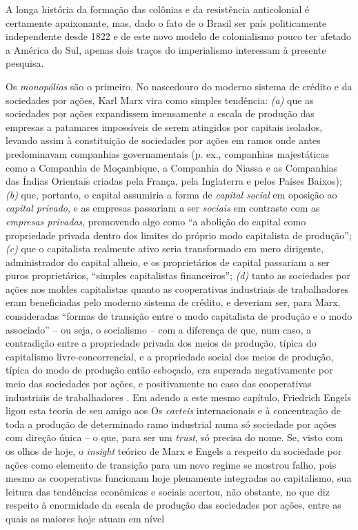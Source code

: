 A longa história da formação das colônias e da resistência anticolonial é certamente apaixonante, mas, dado o fato de o Brasil ser país politicamente independente desde 1822 e de este novo modelo de colonialismo pouco ter afetado a América do Sul, apenas dois traços do imperialismo interessam à presente pesquisa.

Os \textit{monopólios} são o primeiro. No nascedouro do moderno sistema de crédito e da sociedades por ações, Karl Marx vira como simples tendência: \textit{(a)} que as sociedades por ações expandissem imensamente a escala de produção das empresas a patamares impossíveis de serem atingidos por capitais isolados, levando assim à constituição de sociedades por ações em ramos onde antes predominavam companhias governamentais (p. ex., companhias majestáticas como a Companhia de Moçambique, a Companhia do Niassa e as Companhias das Índias Orientais criadas pela França, pela Inglaterra e pelos Países Baixos); \textit{(b)} que, portanto, o capital assumiria a forma de \textit{capital social} em oposição ao \textit{capital privado}, e as empresas passariam a ser \textit{sociais} em contraste com as \textit{empresas privadas}, promovendo algo como ``a abolição do capital como propriedade privada dentro dos limites do próprio modo capitalista de produção''; \textit{(c)} que o capitalista realmente ativo seria transformado em mero dirigente, administrador do capital alheio, e os proprietários de capital passariam a ser puros proprietários, ``simples capitalistas financeiros''; \textit{(d)} tanto as sociedades por ações nos moldes capitalistas quanto as cooperativas industriais de trabalhadores eram beneficiadas pelo moderno sistema de crédito, e deveriam ser, para Marx, consideradas ``formas de transição entre o modo capitalista de produção e o modo associado'' -- ou seja, o socialismo -- com a diferença de que, num caso, a contradição entre a propriedade privada dos meios de produção, típica do capitalismo livre-concorrencial, e a propriedade social dos meios de produção, típica do modo de produção então esboçado, era superada negativamente por meio das sociedades por ações, e positivamente no caso das cooperativas industriais de trabalhadores \cite[p.~581-588]{MARX2008a}. Em adendo a este mesmo capítulo, Friedrich Engels ligou esta teoria de seu amigo aos Os \textit{carteis} internacionais e à concentração de toda a produção de determinado ramo industrial numa só sociedade por ações com direção única \cite[p.~584]{MARX2008a} -- o que, para ser um \textit{trust}, só precisa do nome. Se, visto com os olhos de hoje, o \textit{insight} teórico de Marx e Engels a respeito da sociedade por ações como elemento de transição para um novo regime se mostrou falho, pois mesmo as cooperativas funcionam hoje plenamente integradas ao capitalismo, sua leitura das tendências econômicas e sociais acertou, não obstante, no que diz respeito à enormidade da escala de produção das sociedades por ações, entre as quais as maiores hoje atuam em nível 